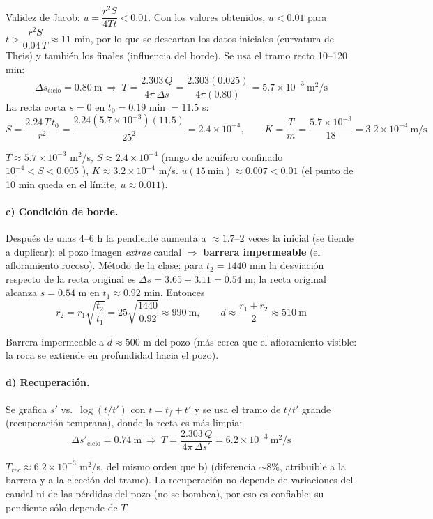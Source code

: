 \documentclass[11pt,letterpaper]{article}
\begin{document}
Validez de Jacob: $u=\dfrac{r^2S}{4Tt}<0.01$. Con los valores obtenidos, $u<0.01$ para $t>\dfrac{r^2S}{0.04\,T}\approx11$ min,
por lo que se descartan los datos iniciales (curvatura de Theis) y también los finales (influencia del borde).
Se usa el tramo recto 10--120 min:
\[
\Delta s_{\text{ciclo}}=0.80\ \text{m}\ \Rightarrow\ T=\frac{2.303\,Q}{4\pi\,\Delta s}=\frac{2.303(0.025)}{4\pi(0.80)}=5.7\times10^{-3}\ \text{m}^2/\text{s}
\]
La recta corta $s=0$ en $t_0=0.19$ min $=11.5$ s:
\[
S=\frac{2.24\,T\,t_0}{r^2}=\frac{2.24(5.7\times10^{-3})(11.5)}{25^2}=2.4\times10^{-4},\qquad
K=\frac{T}{m}=\frac{5.7\times10^{-3}}{18}=3.2\times10^{-4}\ \text{m/s}
\]
\begin{resp}$T\approx5.7\times10^{-3}$ m$^2$/s, $S\approx2.4\times10^{-4}$ (rango de acuífero confinado
$10^{-4}<S<0.005$ \checkmark), $K\approx3.2\times10^{-4}$ m/s. $u(15\ \text{min})\approx0.007<0.01$ \checkmark{} (el punto de 10 min queda en el límite, $u\approx0.011$).\end{resp}

\paragraph{c) Condición de borde.} Después de unas 4--6 h la pendiente aumenta a $\approx1.7$--$2$ veces la inicial
(se tiende a duplicar): el pozo imagen \emph{extrae} caudal $\Rightarrow$ \textbf{barrera impermeable}
(el afloramiento rocoso). Método de la clase: para $t_2=1440$ min la desviación respecto de la recta original es
$\Delta s=3.65-3.11=0.54$ m; la recta original alcanza $s=0.54$ m en $t_1\approx0.92$ min. Entonces
\[
r_2=r_1\sqrt{\frac{t_2}{t_1}}=25\sqrt{\frac{1440}{0.92}}\approx990\ \text{m},\qquad
d\approx\frac{r_1+r_2}{2}\approx510\ \text{m}
\]
\begin{resp}Barrera impermeable a $d\approx500$ m del pozo (más cerca que el afloramiento visible: la roca
se extiende en profundidad hacia el pozo).\end{resp}

\paragraph{d) Recuperación.} Se grafica $s'$ vs.\ $\log(t/t')$ con $t=t_f+t'$ y se usa el tramo de $t/t'$ grande
(recuperación temprana), donde la recta es más limpia:
\[
\Delta s'_{\text{ciclo}}=0.74\ \text{m}\ \Rightarrow\ T=\frac{2.303\,Q}{4\pi\,\Delta s'}=6.2\times10^{-3}\ \text{m}^2/\text{s}
\]
\begin{resp}$T_{rec}\approx6.2\times10^{-3}$ m$^2$/s, del mismo orden que b) (diferencia $\sim8\%$, atribuible
a la barrera y a la elección del tramo). La recuperación no depende de variaciones del caudal ni de las
pérdidas del pozo (no se bombea), por eso es confiable; su pendiente sólo depende de $T$.\end{resp}
\end{document}
